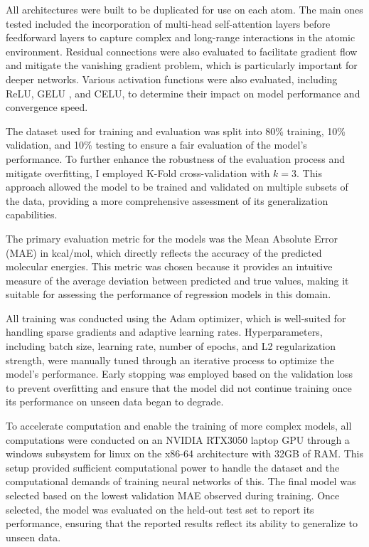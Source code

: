 All architectures were built to be duplicated for use on each atom. The main ones tested included the incorporation of multi-head self-attention layers \cite{vaswani2017attention} before feedforward layers to capture complex and long-range interactions in the atomic environment. Residual connections were also evaluated to facilitate gradient flow and mitigate the vanishing gradient problem, which is particularly important for deeper networks. Various activation functions were also evaluated, including ReLU, GELU \cite{hendrycks2016gaussian}, and CELU, to determine their impact on model performance and convergence speed.

The dataset used for training and evaluation was split into 80\% training, 10\% validation, and 10\% testing to ensure a fair evaluation of the model's performance. To further enhance the robustness of the evaluation process and mitigate overfitting, I employed K-Fold cross-validation with $k=3$. This approach allowed the model to be trained and validated on multiple subsets of the data, providing a more comprehensive assessment of its generalization capabilities.

 The primary evaluation metric for the models was the Mean Absolute Error (MAE) in kcal/mol, which directly reflects the accuracy of the predicted molecular energies. This metric was chosen because it provides an intuitive measure of the average deviation between predicted and true values, making it suitable for assessing the performance of regression models in this domain.

All training was conducted using the Adam optimizer, which is well-suited for handling sparse gradients and adaptive learning rates. Hyperparameters, including batch size, learning rate, number of epochs, and L2 regularization strength, were manually tuned through an iterative process to optimize the model's performance. Early stopping was employed based on the validation loss to prevent overfitting and ensure that the model did not continue training once its performance on unseen data began to degrade.

To accelerate computation and enable the training of more complex models, all computations were conducted on an NVIDIA RTX3050 laptop GPU through a windows subsystem for linux on the x86-64 architecture with 32GB of RAM. This setup provided sufficient computational power to handle the dataset and the computational demands of training neural networks of this. The final model was selected based on the lowest validation MAE observed during training. Once selected, the model was evaluated on the held-out test set to report its performance, ensuring that the reported results reflect its ability to generalize to unseen data.

